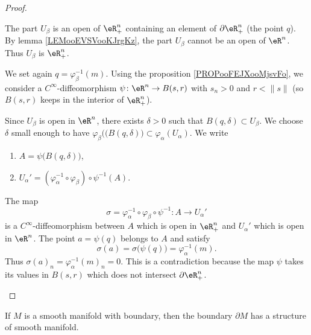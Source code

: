 \begin{proof}
\begin{subproof}
		\begin{subproof}
			The part \( U_{\beta}\) is an open of \( \eR^n_+\) containing an element of \( \partial \eR^n_+\) (the point \( q\)). By lemma \ref{LEMooEVSVooKJrgKz}, the part \( U_{\beta}\) cannot be an open of \( \eR^n\). Thus \( U_{\beta}\) is \( \eR^n_+\).

			We set again \( q=\varphi_{\beta}^{-1}(m)\). Using the proposition  \ref{PROPooFEJXooMjsvFo}, we consider a \( C^{\infty}\)-diffeomorphism \(\psi \colon \eR^n\to B(s,r)  \) with \( s_n>0\) and \( r<\| s \|\) (so \( B(s,r)\) keeps in the interior of \( \eR^n_+\)).

			Since \( U_{\beta}\) is open in \( \eR^n\), there exists \( \delta>0\) such that \( B(q,\delta)\subset U_{\beta}\). We choose \( \delta\) small enough to have \( \varphi_{\beta}(\big( B(q,\delta) \big)\subset \varphi_{\alpha}(U_{\alpha})\). We write
			\begin{enumerate}
				\item
				      \( A=\psi\big( B(q,\delta) \big)\),
				\item
				      \( U_{\alpha}'=(\varphi_{\alpha}^{-1}\circ\varphi_{\beta})\circ\psi^{-1}(A)\).
			\end{enumerate}
			The map
			\begin{equation}
				\sigma=\varphi_{\alpha}^{-1}\circ\varphi_{\beta}\circ\psi^{-1} \colon A\to U_{\alpha}'
			\end{equation}
			is a \( C^{\infty}\)-diffeomorphism between \( A\) which is open in \( \eR^n_+\) and \( U_{\alpha}'\) which is open in \( \eR^n\). The point \( a=\psi(q)\) belongs to \( A\) and satisfy
			\begin{equation}
				\sigma(a)=\sigma\big( \psi(q) \big)=\varphi_{\alpha}^{-1}(m).
			\end{equation}
			Thus \( \sigma(a)_n=\varphi_{\alpha}^{-1}(m)_n=0 \). This is a contradiction because the map \( \psi\) takes its values in \( B(s,r)\) which does not intersect \( \partial \eR^n_+\).
		\end{subproof}
	\end{subproof}
\end{proof}


\begin{proposition}	\label{PROPooTENAooDxIAbf}
	If \( M\) is a smooth manifold with boundary, then the boundary \( \partial M\) has a structure of smooth manifold.
\end{proposition}


